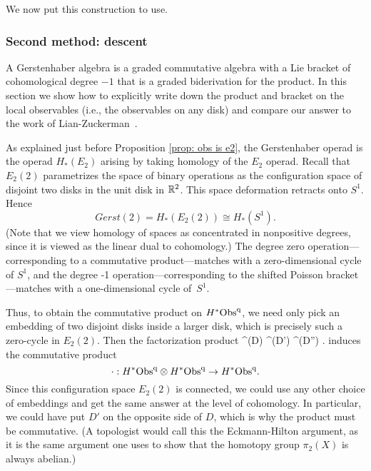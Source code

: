 We now put this construction to use.

\subsubsection{Second method: descent}

A Gerstenhaber algebra is a graded commutative algebra with a Lie bracket of cohomological degree $-1$ that is a graded biderivation for the product. 
In this section we show how to explicitly write down the product and bracket on the local observables (i.e., the observables on any disk) and compare our answer to the work of Lian-Zuckerman~\cite{LZ1}.



As explained just before Proposition \ref{prop: obs is e2}, 
the Gerstenhaber operad is the operad $H_*(E_2)$ arising by taking homology of the $E_2$ operad.
Recall that $E_2(2)$ parametrizes the space of binary operations as the configuration space of disjoint two disks in the unit disk in $\mathbb R^2$.
This space deformation retracts onto $S^1$.
Hence 
\[
Gerst(2) = H_*(E_2(2)) \cong H_*(S^1). 
\]
(Note that we view homology of spaces as concentrated in nonpositive degrees,
since it is viewed as the linear dual to cohomology.)
The degree zero operation---corresponding to a commutative product---matches with a zero-dimensional cycle of $S^1$,
and the degree -1 operation---corresponding to the shifted Poisson bracket---matches with a one-dimensional cycle of~$S^1$. 

Thus, to obtain the commutative product on $H^*{\rm Obs}^{\rm q}$, 
we need only pick an embedding of two disjoint disks inside a larger disk,
which is precisely such a zero-cycle in $E_2(2)$.
Then the factorization product
\ben
\Obs^\q(D) \tensor \Obs^\q(D') \to \Obs^\q(D'') .
\een 
induces the commutative product
\[
\cdot: H^*{\rm Obs}^{\rm q} \otimes H^*{\rm Obs}^{\rm q} \to H^*{\rm Obs}^{\rm q}.
\]
Since this configuration space $E_2(2)$ is connected, 
we could use any other choice of embeddings and get the same answer at the level of cohomology.
In particular, we could have put $D'$ on the opposite side of $D$,
which is why the product must be commutative.
(A topologist would call this the Eckmann-Hilton argument,
as it is the same argument one uses to show that the homotopy group $\pi_2(X)$ is always abelian.)

